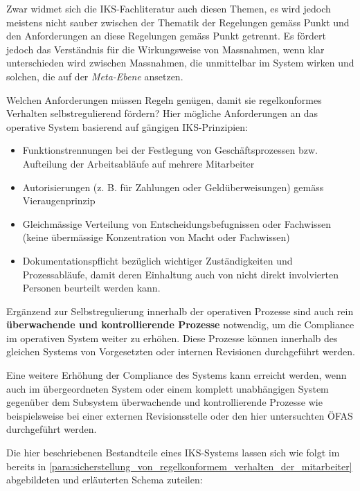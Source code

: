 \documentclass[10pt]{article}
\begin{document}
Zwar widmet sich die IKS-Fachliteratur auch diesen Themen, es wird jedoch meistens nicht sauber zwischen der Thematik der Regelungen gemäss Punkt  und den Anforderungen an diese Regelungen gemäss Punkt  getrennt. Es fördert jedoch das Verständnis für die Wirkungsweise von Massnahmen, wenn klar unterschieden wird zwischen Massnahmen, die unmittelbar im System wirken und solchen, die auf der \textit{Meta-Ebene} ansetzen.

Welchen Anforderungen müssen Regeln genügen, damit sie regelkonformes Verhalten selbstregulierend fördern? Hier mögliche Anforderungen an das operative System basierend auf gängigen IKS-Prinzipien:

\begin{itemize}
    \item Funktionstrennungen bei der Festlegung von Geschäftsprozessen bzw. Aufteilung der Arbeitsabläufe auf mehrere Mitarbeiter

    \item Autorisierungen (z. B. für Zahlungen oder Geldüberweisungen) gemäss Vieraugenprinzip

    \item Gleichmässige Verteilung von Entscheidungsbefugnissen oder Fachwissen \\
(keine übermässige Konzentration von Macht oder Fachwissen)

    \item Dokumentationspflicht bezüglich wichtiger Zuständigkeiten und Prozessabläufe, damit deren Einhaltung auch von nicht direkt involvierten Personen beurteilt werden kann.

\end{itemize}

Ergänzend zur Selbstregulierung innerhalb der operativen Prozesse sind auch rein \textbf{überwachende und kontrollierende Prozesse } notwendig, um die Compliance im operativen System weiter zu erhöhen. Diese Prozesse können innerhalb des gleichen Systems von Vorgesetzten oder internen Revisionen durchgeführt werden.

Eine weitere Erhöhung der Compliance des Systems kann erreicht werden, wenn auch im übergeordneten System oder einem komplett unabhängigen System gegenüber dem Subsystem überwachende und kontrollierende Prozesse wie beispielsweise bei einer externen Revisionsstelle oder den hier untersuchten ÖFAS durchgeführt werden.

Die hier beschriebenen Bestandteile eines IKS-Systems lassen sich wie folgt im bereits in \vref{para:sicherstellung_von_regelkonformem_verhalten_der_mitarbeiter} abgebildeten und erläuterten Schema zuteilen:
\end{document}
